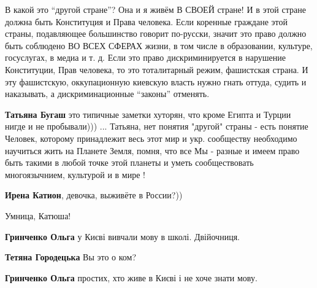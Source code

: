 \begin{itemize}
\begin{itemize}
В какой это \enquote{другой стране}? Она и я живём В СВОЕЙ стране! И в этой стране
должна быть Конституция и Права человека. Если коренные граждане этой страны,
подавляющее большинство говорит по-русски, значит это право должно быть
соблюдено ВО ВСЕХ СФЕРАХ жизни, в том числе в образовании, культуре,
госуслугах, в медиа и т. д. Если это право дискриминируется в нарушение
Конституции, Прав человека, то это тоталитарный режим, фашистская страна. И эту
фашистскую, оккупационную киевскую власть нужно гнать оттуда, судить и
наказывать, а дискриминационные \enquote{законы} отменять.

\par
\textbf{Татьяна Бугаш} это типичные заметки хуторян, что кроме Египта и Турции
нигде и не пробывали))) ... Татьяна, нет понятия "другой" страны - есть понятие
Человек, которому принадлежит весь этот мир и укр. сообществу необходимо
научиться жить на Планете Земля, помня, что все Мы - разные и имеем право быть
такими в любой точке этой планеты и уметь сообществовать многоязычнием,
культурой и в мире !

\textbf{Ирена Катион}, девочка, выживёте в России?))
\end{itemize}

Умница, Катюша!

\begin{itemize}
\textbf{Гринченко Ольга} у Києві вивчали мову в школі. Двійочниця.

\textbf{Тетяна Городецька} Вы это о ком?

\textbf{Гринченко Ольга} простих, хто живе в Києві і не хоче знати мову.
\end{itemize}

\end{itemize}

